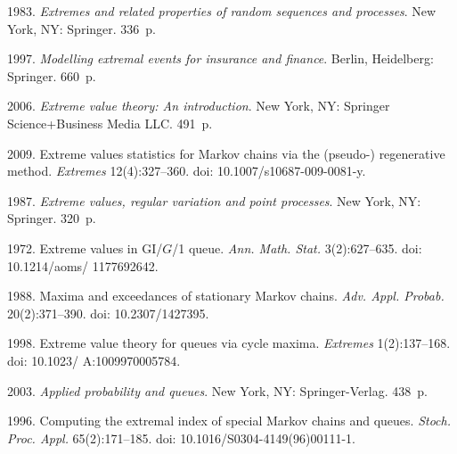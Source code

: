   \begin{multicols}{2}

\renewcommand{\bibname}{\protect\rmfamily References}

{\small\frenchspacing
 {%
 \begin{thebibliography}{99}
 
 \vspace*{-2pt}
 
 1983. \textit{Extremes and related properties of random sequences and processes}. New York, NY: 
 Springer. 336~p.

 1997. 
\textit{Modelling extremal events for insurance and finance}. Berlin, Heidelberg:   Springer. 660~p.

 2006.  \textit{Extreme value theory:  An introduction}.
New York, NY:  Springer Science\;+\;Business Media LLC. 491~p.



 2009.
Extreme values statistics for Markov chains via the (\mbox{pseudo-}) 
regenerative method. \textit{Extremes} 12(4):327--360. doi: 10.1007/s10687-009-0081-y.

 1987.
\textit{Extreme values, regular variation and point processes}. 
New York, NY: Springer. 320~p. 




 1972. 
Extreme values in GI/$G$/1 queue. \textit{Ann. Math. Stat.} 3(2):627--635. doi: 10.1214/aoms/ 1177692642.


 1988.
Maxima and exceedances of stationary Markov chains.
{\it Adv. Appl. Probab.} 20(2):371--390. doi: 10.2307/1427395.

 1998. Extreme value theory for queues via cycle maxima. 
\textit{Extremes} 1(2):137--168. doi: 10.1023/ A:1009970005784.

 2003. \textit{Applied probability and queues}. New York, NY: Springer-Verlag. 438~p. 



 1996. Computing the extremal index of special
Markov chains and queues. \textit{Stoch. Proc. Appl.} 65(2):171--185. 
doi: 10.1016/S0304-4149(96)00111-1.



\end{thebibliography}}}
\end{multicols}
